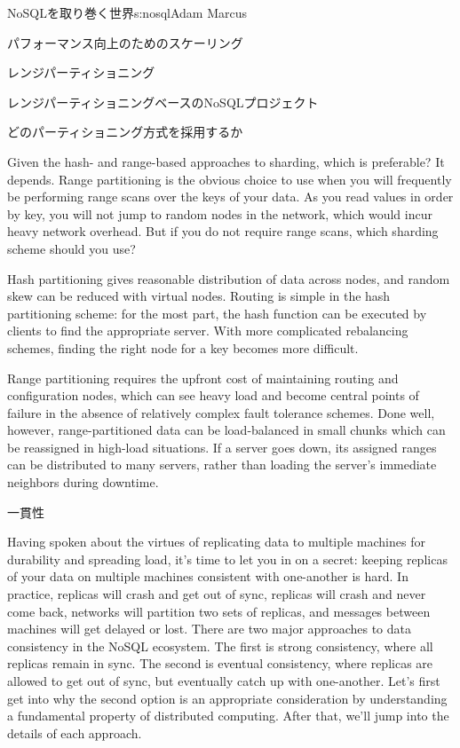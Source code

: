 \begin{aosachapter}{NoSQLを取り巻く世界}{s:nosql}{Adam Marcus}
\begin{aosasect1}{パフォーマンス向上のためのスケーリング}
\begin{aosasect2}{レンジパーティショニング}
\begin{aosasect3}{レンジパーティショニングベースのNoSQLプロジェクト}
\end{aosasect3}

\end{aosasect2}

\begin{aosasect2}{どのパーティショニング方式を採用するか}

Given the hash- and range-based approaches to sharding, which is
preferable?  It depends.  Range partitioning is the obvious choice to
use when you will frequently be performing range scans over the keys
of your data.  As you read values in order by key, you will not jump
to random nodes in the network, which would incur heavy network
overhead.  But if you do not require range scans, which sharding
scheme should you use?

Hash partitioning gives reasonable distribution of data across nodes,
and random skew can be reduced with virtual nodes.  Routing is simple
in the hash partitioning scheme: for the most part, the hash function
can be executed by clients to find the appropriate server.  With more
complicated rebalancing schemes, finding the right node for a key
becomes more difficult.

Range partitioning requires the upfront cost of maintaining
routing and configuration nodes, which can see heavy load and become
central points of failure in the absence of relatively complex fault
tolerance schemes.  Done well, however, range-partitioned data can be
load-balanced in small chunks which can be reassigned in high-load
situations.  If a server goes down, its assigned ranges can be
distributed to many servers, rather than loading the server's
immediate neighbors during downtime.

\end{aosasect2}

\end{aosasect1}

\begin{aosasect1}{一貫性}
\label{sec.nosql.consistency}

Having spoken about the virtues of replicating data to multiple
machines for durability and spreading load, it's time to let you in on
a secret: keeping replicas of your data on multiple machines
consistent with one-another is hard.  In practice, replicas will crash
and get out of sync, replicas will crash and never come back, networks
will partition two sets of replicas, and messages between machines
will get delayed or lost.  There are two major approaches to data
consistency in the NoSQL ecosystem.  The first is strong consistency, where all
replicas remain in sync.  The second is eventual consistency, where replicas are
allowed to get out of sync, but eventually catch up with one-another.
Let's first get into why the second option is an appropriate
consideration by understanding a fundamental property of distributed
computing.  After that, we'll jump into the details of each approach.


\end{aosasect1}
\end{aosachapter}
